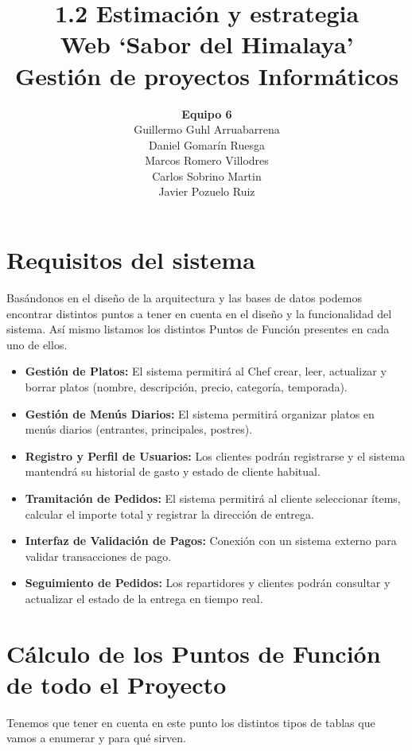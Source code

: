 \documentclass[12pt,a4paper]{article}
\title{\textbf{1.2 Estimación y estrategia} \\ \Large Web `Sabor del Himalaya' \\ \large Gestión de proyectos Informáticos}
\author{
    \textbf{Equipo 6} \\
    Guillermo Guhl Arruabarrena \\
    Daniel Gomarín Ruesga \\
    Marcos Romero Villodres \\
    Carlos Sobrino Martin \\
    Javier Pozuelo Ruiz
}
\date{}
\begin{document}
\maketitle

\tableofcontents
\newpage

\section{Requisitos del sistema}
Basándonos en el diseño de la arquitectura y las bases de datos podemos encontrar distintos puntos a tener en cuenta en el diseño y la funcionalidad del sistema. Así mismo listamos los distintos Puntos de Función presentes en cada uno de ellos.

\begin{itemize}
    \item \textbf{Gestión de Platos:} El sistema permitirá al Chef crear, leer, actualizar y borrar platos (nombre, descripción, precio, categoría, temporada).
    \item \textbf{Gestión de Menús Diarios:} El sistema permitirá organizar platos en menús diarios (entrantes, principales, postres).
    \item \textbf{Registro y Perfil de Usuarios:} Los clientes podrán registrarse y el sistema mantendrá su historial de gasto y estado de cliente habitual.
    \item \textbf{Tramitación de Pedidos:} El sistema permitirá al cliente seleccionar ítems, calcular el importe total y registrar la dirección de entrega.
    \item \textbf{Interfaz de Validación de Pagos:} Conexión con un sistema externo para validar transacciones de pago.
    \item \textbf{Seguimiento de Pedidos:} Los repartidores y clientes podrán consultar y actualizar el estado de la entrega en tiempo real.
\end{itemize}

\section{Cálculo de los Puntos de Función de todo el Proyecto}
Tenemos que tener en cuenta en este punto los distintos tipos de tablas que vamos a enumerar y para qué sirven.
\end{document}
